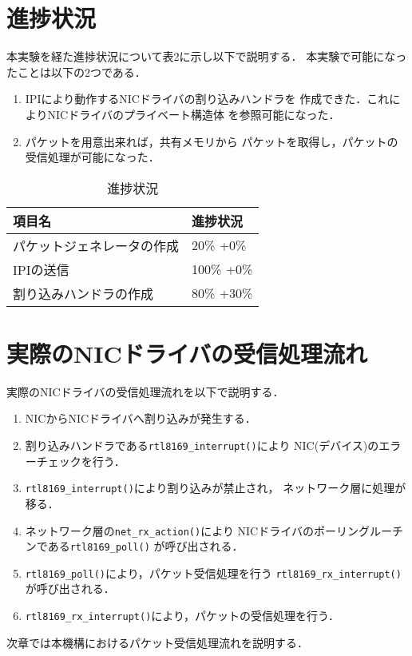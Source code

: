 \documentclass[12pt]{jsarticle}
\begin{document}
\section{進捗状況}
本実験を経た進捗状況について表2に示し以下で説明する．
本実験で可能になったことは以下の2つである．
\begin{enumerate}
    \item IPIにより動作するNICドライバの割り込みハンドラを
        作成できた．これによりNICドライバのプライベート構造体
        を参照可能になった．
    \item パケットを用意出来れば，共有メモリから
        パケットを取得し，パケットの受信処理が可能になった．
\end{enumerate}

\begin{table}[htbp]
\caption{進捗状況}
\label{kankyou}
\begin{center}
\begin{tabular}{l|l}   \hline 
項目名                          & 進捗状況    \\  \hline
パケットジェネレータの作成      & 20\% +0\%  \\ 
IPIの送信                       & 100\% +0\% \\ 
割り込みハンドラの作成          & 80\% +30\%    \\ 
           
\end{tabular}
\end{center}
\end{table}

\section{実際のNICドライバの受信処理流れ}
実際のNICドライバの受信処理流れを以下で説明する．
\begin{enumerate}
    \item NICからNICドライバへ割り込みが発生する．
    \item 割り込みハンドラである{\tt rtl8169\_interrupt()}により
        NIC(デバイス)のエラーチェックを行う．
    \item {\tt rtl8169\_interrupt()}により割り込みが禁止され，
        ネットワーク層に処理が移る．
    \item ネットワーク層の{\tt net\_rx\_action()}により
        NICドライバのポーリングルーチンである{\tt rtl8169\_poll()}
        が呼び出される．
    \item {\tt rtl8169\_poll()}により，パケット受信処理を行う
        {\tt rtl8169\_rx\_interrupt()}が呼び出される．
    \item {\tt rtl8169\_rx\_interrupt()}により，パケットの受信処理を行う． 
\end{enumerate}
次章では本機構におけるパケット受信処理流れを説明する．
\end{document}

